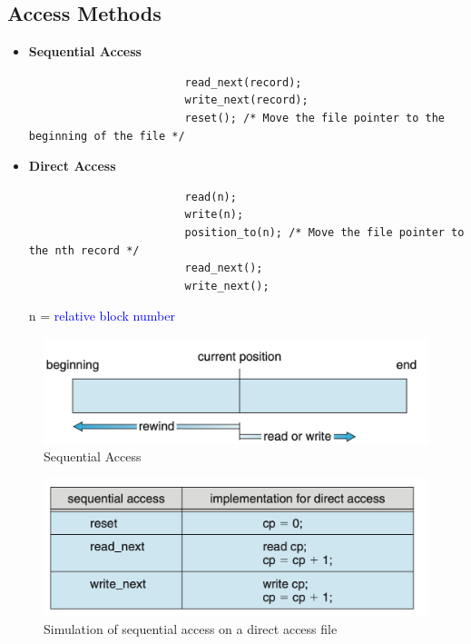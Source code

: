 \documentclass{book/custombook}
\begin{document}
            \subsection{Access Methods}
                \begin{itemize}
                    \item \textbf{Sequential Access}
                    \begin{verbatim}
                        read_next(record);
                        write_next(record);
                        reset(); /* Move the file pointer to the beginning of the file */ 
                    \end{verbatim}
                    \item \textbf{Direct Access}
                    \begin{verbatim}
                        read(n);
                        write(n);
                        position_to(n); /* Move the file pointer to the nth record */
                        read_next();
                        write_next();
                    \end{verbatim}
                    n = \textcolor{blue}{relative block number}
                \end{itemize}
                \begin{figure}[H]
                    \centering
                    \includegraphics[width=0.6\linewidth]{figures/sequential_access.png}
                    \caption{Sequential Access}
                \end{figure}
                \begin{figure}[H]
                    \centering
                    \includegraphics[width=0.6\linewidth]{figures/sequential_access_sim.png}
                    \caption{Simulation of sequential access on a direct access file}
                \end{figure}
\end{document}
